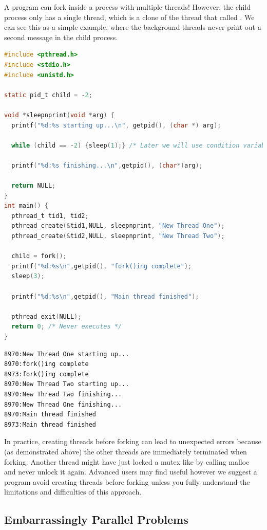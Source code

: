 A program can fork inside a process with multiple threads!
However, the child process only has a single thread, which is a clone of the thread that called .
We can see this as a simple example, where the background threads never print out a second message in the child process.

\begin{lstlisting}[language=C]
#include <pthread.h>
#include <stdio.h>
#include <unistd.h>

static pid_t child = -2;

void *sleepnprint(void *arg) {
  printf("%d:%s starting up...\n", getpid(), (char *) arg);

  while (child == -2) {sleep(1);} /* Later we will use condition variables */

  printf("%d:%s finishing...\n",getpid(), (char*)arg);

  return NULL;
}
int main() {
  pthread_t tid1, tid2;
  pthread_create(&tid1,NULL, sleepnprint, "New Thread One");
  pthread_create(&tid2,NULL, sleepnprint, "New Thread Two");

  child = fork();
  printf("%d:%s\n",getpid(), "fork()ing complete");
  sleep(3);

  printf("%d:%s\n",getpid(), "Main thread finished");

  pthread_exit(NULL);
  return 0; /* Never executes */
}
\end{lstlisting}

\begin{verbatim}
8970:New Thread One starting up...
8970:fork()ing complete
8973:fork()ing complete
8970:New Thread Two starting up...
8970:New Thread Two finishing...
8970:New Thread One finishing...
8970:Main thread finished
8973:Main thread finished
\end{verbatim}

In practice, creating threads before forking can lead to unexpected errors because (as demonstrated above) the other threads are immediately terminated when forking.
Another thread might have just locked a mutex like by calling malloc and never unlock it again.
Advanced users may find  useful however we suggest a program avoid creating threads before forking unless you fully understand the limitations and difficulties of this approach.

\subsection{Embarrassingly Parallel Problems}

